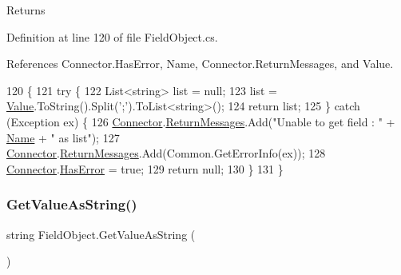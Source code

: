 \begin{DoxyReturn}{Returns}

\end{DoxyReturn}


Definition at line 120 of file Field\+Object.\+cs.



References Connector.\+Has\+Error, Name, Connector.\+Return\+Messages, and Value.


\begin{DoxyCode}
120                                          \{
121         \textcolor{keywordflow}{try} \{
122             List<string> list = null;
123             list = \mbox{\hyperlink{class_field_object_a9764fb1824cec95b82cd6ac0b4cd8919}{Value}}.ToString().Split(\textcolor{charliteral}{';'}).ToList<\textcolor{keywordtype}{string}>();
124             \textcolor{keywordflow}{return} list;
125         \} \textcolor{keywordflow}{catch} (Exception ex) \{
126             \mbox{\hyperlink{class_connector}{Connector}}.\mbox{\hyperlink{class_connector_a1ed422674b344524fd77998dcf6a9ba6}{ReturnMessages}}.Add(\textcolor{stringliteral}{"Unable to get field : "} + 
      \mbox{\hyperlink{class_field_object_ae5d972e96a3eca93407da8e8a89abfd1}{Name}} + \textcolor{stringliteral}{" as list"});
127             \mbox{\hyperlink{class_connector}{Connector}}.\mbox{\hyperlink{class_connector_a1ed422674b344524fd77998dcf6a9ba6}{ReturnMessages}}.Add(Common.GetErrorInfo(ex));
128             \mbox{\hyperlink{class_connector}{Connector}}.\mbox{\hyperlink{class_connector_a9365777a6b7b711b75bcfa6c4d53e989}{HasError}} = \textcolor{keyword}{true};
129             \textcolor{keywordflow}{return} null;
130         \}
131     \}
\end{DoxyCode}
\mbox{\label{class_field_object_ad223b04d429de4b2c57838ffb41d124b}} 
\subsubsection{\texorpdfstring{Get\+Value\+As\+String()}{GetValueAsString()}}
{\footnotesize\ttfamily string Field\+Object.\+Get\+Value\+As\+String (\begin{DoxyParamCaption}{ }\end{DoxyParamCaption})}



